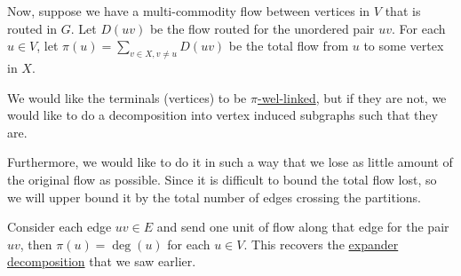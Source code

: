 Now, suppose we have a multi-commodity flow between vertices in \(V\) that is routed in \(G\). Let \(D(uv)\) be the flow routed for the unordered pair \(uv\). For each \(u \in V\), let \(\pi (u) = \sum_{v \in X, v \neq u} D(uv)\) be the total flow from \(u\) to some vertex in \(X\).

\begin{intuition}
	We would like the terminals (vertices) to be \hyperref[def:weighted-well-linked]{\(\pi \)-wel-linked}, but if they are not, we would like to do a decomposition into vertex induced subgraphs such that they are.
\end{intuition}

Furthermore, we would like to do it in such a way that we lose as little amount of the original flow as possible. Since it is difficult to bound the total flow lost, so we will upper bound it by the total number of edges crossing the partitions.

\begin{note}
	Consider each edge \(uv \in E\) and send one unit of flow along that edge for the pair \(uv\), then \(\pi (u) = \deg(u)\) for each \(u \in V\). This recovers the \hyperref[def:expander-decomposition]{expander decomposition} that we saw earlier.
\end{note}

